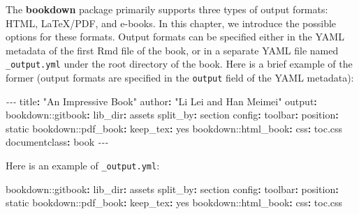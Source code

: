\documentclass[
  12pt,
]{krantz}
\newenvironment{Shaded}{\begin{snugshade}}{\end{snugshade}}
\newcommand{\AttributeTok}[1]{\textcolor[rgb]{0.77,0.63,0.00}{#1}}
\newcommand{\CharTok}[1]{\textcolor[rgb]{0.31,0.60,0.02}{#1}}
\newcommand{\FunctionTok}[1]{\textcolor[rgb]{0.00,0.00,0.00}{#1}}
\newcommand{\KeywordTok}[1]{\textcolor[rgb]{0.13,0.29,0.53}{\textbf{#1}}}
\newcommand{\PreprocessorTok}[1]{\textcolor[rgb]{0.56,0.35,0.01}{\textit{#1}}}
\newcommand{\StringTok}[1]{\textcolor[rgb]{0.31,0.60,0.02}{#1}}
\theoremstyle{definition}
\theoremstyle{definition}
\theoremstyle{definition}
\theoremstyle{definition}
\theoremstyle{remark}
\begin{document}
The \textbf{bookdown} package primarily supports three types of output formats: HTML, LaTeX/PDF, and e-books. In this chapter, we introduce the possible options for these formats. Output formats can be specified either in the YAML metadata of the first Rmd file of the book, or in a separate YAML file named \texttt{\_output.yml} under the root directory of the book. Here is a brief example of the former (output formats are specified in the \texttt{output} field of the YAML metadata):

\begin{Shaded}
\begin{Highlighting}[]
\PreprocessorTok{{-}{-}{-}}
\FunctionTok{title}\KeywordTok{:}\AttributeTok{ }\StringTok{"An Impressive Book"}
\FunctionTok{author}\KeywordTok{:}\AttributeTok{ }\StringTok{"Li Lei and Han Meimei"}
\FunctionTok{output}\KeywordTok{:}
\AttributeTok{  bookdown:}\FunctionTok{:gitbook}\KeywordTok{:}
\AttributeTok{    }\FunctionTok{lib\_dir}\KeywordTok{:}\AttributeTok{ assets}
\AttributeTok{    }\FunctionTok{split\_by}\KeywordTok{:}\AttributeTok{ section}
\AttributeTok{    }\FunctionTok{config}\KeywordTok{:}
\AttributeTok{      }\FunctionTok{toolbar}\KeywordTok{:}
\AttributeTok{        }\FunctionTok{position}\KeywordTok{:}\AttributeTok{ static}
\AttributeTok{  bookdown:}\FunctionTok{:pdf\_book}\KeywordTok{:}
\AttributeTok{    }\FunctionTok{keep\_tex}\KeywordTok{:}\AttributeTok{ }\CharTok{yes}
\AttributeTok{  bookdown:}\FunctionTok{:html\_book}\KeywordTok{:}
\AttributeTok{    }\FunctionTok{css}\KeywordTok{:}\AttributeTok{ toc.css}
\FunctionTok{documentclass}\KeywordTok{:}\AttributeTok{ book}
\PreprocessorTok{{-}{-}{-}}
\end{Highlighting}
\end{Shaded}

Here is an example of \texttt{\_output.yml}:

\begin{Shaded}
\begin{Highlighting}[]
\AttributeTok{bookdown:}\FunctionTok{:gitbook}\KeywordTok{:}
\AttributeTok{  }\FunctionTok{lib\_dir}\KeywordTok{:}\AttributeTok{ assets}
\AttributeTok{  }\FunctionTok{split\_by}\KeywordTok{:}\AttributeTok{ section}
\AttributeTok{  }\FunctionTok{config}\KeywordTok{:}
\AttributeTok{    }\FunctionTok{toolbar}\KeywordTok{:}
\AttributeTok{      }\FunctionTok{position}\KeywordTok{:}\AttributeTok{ static}
\AttributeTok{bookdown:}\FunctionTok{:pdf\_book}\KeywordTok{:}
\AttributeTok{  }\FunctionTok{keep\_tex}\KeywordTok{:}\AttributeTok{ }\CharTok{yes}
\AttributeTok{bookdown:}\FunctionTok{:html\_book}\KeywordTok{:}
\AttributeTok{  }\FunctionTok{css}\KeywordTok{:}\AttributeTok{ toc.css}
\end{Highlighting}
\end{Shaded}
\end{document}
